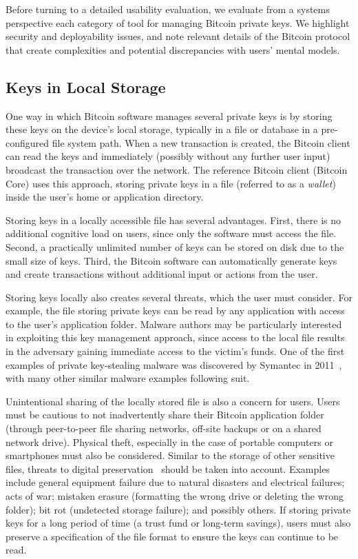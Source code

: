 Before turning to a detailed usability evaluation, we evaluate from a systems perspective each category of tool for managing Bitcoin private keys. We highlight security and deployability issues, and note relevant details of the Bitcoin protocol that create complexities and potential discrepancies with users' mental models.

\subsection{Keys in Local Storage}
\label{sec:localstorage}
One way in which Bitcoin software manages several private keys is by storing these keys on the device's local storage, typically in a file or database in a pre-configured file system path. When a new transaction is created, the Bitcoin client can read the keys and immediately (possibly without any further user input) broadcast the transaction over the network. The reference Bitcoin client (Bitcoin Core) uses this approach, storing private keys in a file (referred to as a \emph{wallet}) inside the user's home or application directory. 

Storing keys in a locally accessible file has several advantages. First, there is no additional cognitive load on users, since only the software must access the file. Second, a practically unlimited number of keys can be stored on disk due to the small size of keys. Third, the Bitcoin software can automatically generate keys and create transactions without additional input or actions from the user. 

Storing keys locally also creates several threats, which the user must consider. For example, the file storing private keys can be read by any application with access to the user's application folder. Malware authors may be particularly interested in exploiting this key management approach, since access to the local file results in the adversary gaining immediate access to the victim's funds. One of the first examples of private key-stealing malware was discovered by Symantec in 2011~\cite{coinbit}, with many other similar malware examples following suit.


Unintentional sharing of the locally stored file is also a concern for users. Users must be cautious to not inadvertently share their Bitcoin application folder (\eg through peer-to-peer file sharing networks, off-site backups or on a shared network drive). Physical theft, especially in the case of portable computers or smartphones must also be considered. Similar to the storage of other sensitive files, threats to digital preservation~\cite{BKM05} should be taken into account. Examples include general equipment failure due to natural disasters and electrical failures; acts of war; mistaken erasure (\eg formatting the wrong drive or deleting the wrong folder); bit rot (\ie undetected storage failure); and possibly others. If storing private keys for a long period of time (\eg a trust fund or long-term savings), users must also preserve a specification of the file format to ensure the keys can continue to be read.

